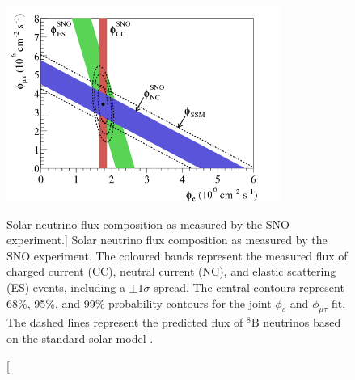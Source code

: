 \begin{figure}

	\centering

	\includegraphics[width=0.8\textwidth]{figures/sno_flux.png}

	\caption
	[Solar neutrino flux composition as measured by the SNO experiment.]
	{Solar neutrino flux composition as measured by the SNO experiment. The
	coloured bands represent the measured flux of charged current (CC),
	neutral current (NC), and elastic scattering (ES) events, including a \(\pm 1
	\sigma\) spread. The central contours represent 68\%, 95\%, and 99\%
	probability contours for the joint \(\phi_e\) and \(\phi_{\mu \tau}\) fit. The
	dashed lines represent the predicted flux of \(^8\mbox{B}\) neutrinos based on 
	the standard solar model \cite{Ahmad2002}. }

	\label{fig:sno_flux}

\end{figure}

